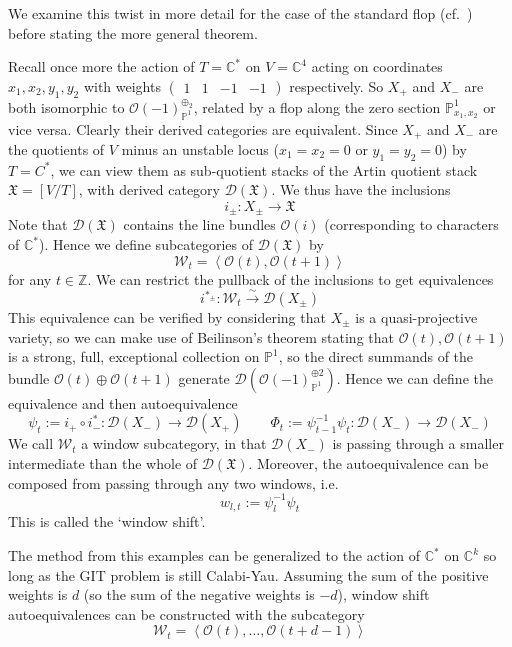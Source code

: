 We examine this twist in more detail for the case of the standard flop (cf.~\cite{donovan_window_2014}) before stating the more general theorem. 

Recall once more the action of $T = \mathbb{C}^*$ on $V = \mathbb{C}^4$  acting on coordinates $x_{1}, x_{2}, y_{1},y_{2}$ with weights $\begin{pmatrix}1&1&-1&-1\end{pmatrix}$ respectively. So $X_+$ and $X_-$ are both isomorphic to $\mathcal{O}(-1)_{\mathbb{P}^1}^{\oplus_{2}}$, related by a flop along the zero section $\mathbb{P}^1_{x_{1},x_{2}}$ or vice versa. Clearly their derived categories are equivalent. Since $X_+$ and $X_-$ are the quotients of $V$ minus an unstable locus ($x_{1}= x_{2}= 0$ or $y_{1}= y_{2}=0$)  by $T = C^{*}$, we can view them as sub-quotient stacks of the Artin quotient stack $\mathfrak{X}=[V/T]$, with derived category $\mathcal{D}(\mathfrak{X})$. We thus have the inclusions $$
i_{\pm}: X_{\pm}\to \mathfrak{X}
$$
Note that $\mathcal{D}(\mathfrak{X})$ contains the line bundles $\mathcal{O}(i)$ (corresponding to characters of $\mathbb{C}^*$).  Hence we define subcategories of $\mathcal{D}(\mathfrak{X})$ by $$
 \mathcal{W}_{t}= \left< \mathcal{O}(t), \mathcal{O}(t+1) \right> 
$$ for any $t \in \mathbb{Z}$. We can restrict the pullback of the inclusions to get equivalences $$
i^{*_{\pm}}:\mathcal{W}_{t} \xrightarrow{\sim} \mathcal{D}(X_{\pm})
$$
This equivalence can be verified by considering that $X_\pm$ is a quasi-projective variety, so we can make use of Beilinson's theorem stating that $\mathcal{O}(t), \mathcal{O}(t+1)$ is a strong, full, exceptional collection on $\mathbb{P}^1$, so the direct summands of the bundle $\mathcal{O}(t)\oplus \mathcal{O}(t+1)$ generate  $\mathcal{D}(\mathcal{O}(-1)_{\mathbb{P}^{1}}^{\oplus {2}})$.  Hence we can define the equivalence and then autoequivalence $$
\psi_{t}:= i_{+}\circ i_{-}^{*}: \mathcal{D}(X_{-})\to \mathcal{D}(X_{+}) \qquad \Phi_{t}:= \psi_{t-1}^{-1}\psi_{t}: \mathcal{D}(X_{-})\to \mathcal{D}(X_{-})
$$
We call $\mathcal{W}_t$ a window subcategory, in that $\mathcal{D}(X_{-})$ is passing through a smaller intermediate than the whole of $\mathcal{D}(\mathfrak{X})$. Moreover, the autoequivalence can be composed from passing through any two windows, i.e. $$
w_{l,t}:= \psi_{l}^{-1}\psi_t
$$
This is called the `window shift'. 

\begin{remark}{}{}
	The method from this examples can be generalized to the action of $\mathbb{C}^*$ on $\mathbb{C}^k$ so long as the GIT problem is still Calabi-Yau. Assuming the sum of the positive weights is $d$ (so the sum of the negative weights is $-d$), window shift autoequivalences can be constructed with the subcategory $$\mathcal{W}_{t}= \left< \mathcal{O}(t),\dots, \mathcal{O}(t+d-1) \right> $$
\end{remark}


